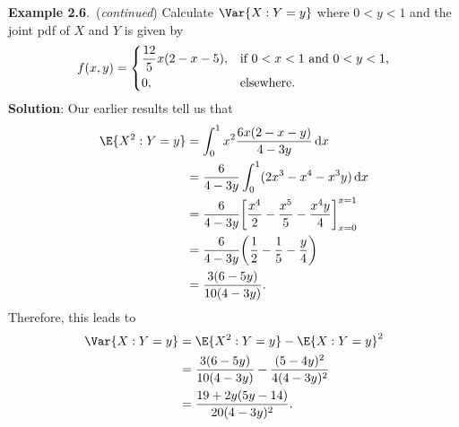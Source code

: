 \begin{Example}
    \textbf{Example 2.6}.\ (\emph{continued}) Calculate $ \Var{X\given Y=y} $ where $ 0<y<1 $ and the joint pdf of
    $ X $ and $ Y $ is given by
    \[ f(x,y)=\begin{dcases}
            \frac{12}{5}x(2-x-5), & \text{if $ 0<x<1 $ and $ 0<y<1 $,} \\
            0,                    & \text{elsewhere}.
        \end{dcases} \]
    \tcblower{}
    \textbf{Solution}: Our earlier results tell us that
    \begin{align*}
        \E{X^2\given Y=y}
         & =\int_{0}^{1}x^2 \frac{6x(2-x-y)}{4-3y} \odif{x}                                         \\
         & =\frac{6}{4-3y} \int_{0}^{1}(2x^3-x^4-x^3y)\odif{x}                                      \\
         & =\frac{6}{4-3y} \biggl[\frac{x^4}{2} -\frac{x^5}{5} -\frac{x^4 y}{4} \biggr]_{x=0}^{x=1} \\
         & =\frac{6}{4-3y} \biggl(\frac{1}{2} -\frac{1}{5} -\frac{y}{4} \biggr)                     \\
         & =\frac{3(6-5y)}{10(4-3y)}.
    \end{align*}
    Therefore, this leads to
    \begin{align*}
        \Var{X\given Y=y}
         & =\E{X^2\given Y=y}-\E{X\given Y=y}^2                  \\
         & =\frac{3(6-5y)}{10(4-3y)} -\frac{(5-4y)^2}{4(4-3y)^2} \\
         & =\frac{19+2y(5y-14)}{20(4-3y)^2}.
    \end{align*}
\end{Example}
